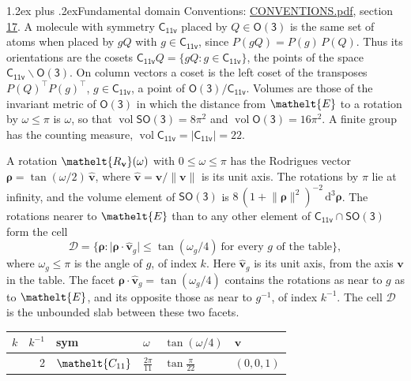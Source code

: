 \documentclass[10pt,a4paper]{article}
\makeatletter
\renewcommand\section{\@startsection{section}{1}{\z@}{-3ex plus -1ex minus -.2ex}%
  {1.2ex plus .2ex}{\normalfont\large\sffamily\bfseries\color{parttitle}}}
\numberwithin{equation}{section}
\newcommand{\eltfont}[1]{{\let\sigma\eltsigma\mathelt{#1}}}
\newcommand{\grp}[1]{\mathsf{#1}}
\newcommand{\cls}[1]{\eltfont{#1}}
\newcommand{\elt}[1]{\eltfont{#1}}
\newcommand{\dirvec}[3]{(#1, #2, #3)}
\newcommand{\unitaxis}{\hat{\mathbf{v}}}
\newcommand{\vv}{\mathbf{v}}
\newcommand{\diff}{\mathrm{d}}
\newcommand{\vol}{\operatorname{vol}}
\newcommand{\rodrigues}{\boldsymbol{\rho}}
\newcommand{\fcell}{\mathcal{D}}
\makeatother
\begin{document}
\section{Fundamental domain}\label{s:fundamental_domain}
Conventions: \href{../../CONVENTIONS.pdf}{CONVENTIONS.pdf}, section \href{../../CONVENTIONS.pdf\#conv.17}{17}.
\leavevmode\label{n:element.placement}A molecule with symmetry $\grp{C_{11v}}$ placed by $Q \in \grp{O(3)}$ is the same set of atoms when placed by $gQ$ with $g \in \grp{C_{11v}}$, since $P(gQ) = P(g)\,P(Q)$. \label{n:operator.cosets}Thus its orientations are the cosets $\grp{C_{11v}}Q = \{gQ : g \in \grp{C_{11v}}\}$, the points of the space $\grp{C_{11v}}\backslash\grp{O(3)}$. On column vectors a coset is the left coset of the transposes $P(Q)^{\top}P(g)^{\top}$, $g \in \grp{C_{11v}}$, a point of $\grp{O(3)}/\grp{C_{11v}}$.
\leavevmode\label{n:operator.volume}Volumes are those of the invariant metric of \href{O3.pdf}{$\grp{O(3)}$} in which the distance from $\elt{E}$ to a rotation by $\omega \le \pi$ is $\omega$, so that $\vol\grp{SO(3)} = 8\pi^2$ and $\vol\grp{O(3)} = 16\pi^2$. A finite group has the counting measure, $\vol\grp{C_{11v}} = |\grp{C_{11v}}| = 22$.

\leavevmode\label{n:vector.rodrigues}\label{n:vector.unitaxis}A rotation $\elt{R_{\vv}}(\omega)$ with $0 \le \omega \le \pi$ has the Rodrigues vector $\rodrigues = \tan(\omega/2)\,\unitaxis$, where $\unitaxis = \vv/\lVert\vv\rVert$ is its unit axis. The rotations by $\pi$ lie at infinity, and the volume element of \href{SO3.pdf}{$\grp{SO(3)}$} is $8\,(1 + \lVert\rodrigues\rVert^2)^{-2}\,\diff^3\rodrigues$.
\leavevmode\label{n:set.cell}The rotations nearer to $\elt{E}$ than to any other element of $\grp{C_{11v}} \cap \grp{SO(3)}$ form the cell
\begin{equation}\label{e:cell}\fcell = \bigl\{\rodrigues : \lvert\rodrigues\cdot\unitaxis_g\rvert \le \tan(\omega_g/4)\ \text{for every $g$ of the table}\bigr\},\end{equation}
where $\omega_g \le \pi$ is the angle of $g$, of index $k$. Here $\unitaxis_g$ is its unit axis, from the axis $\vv$ in the table. The facet $\rodrigues\cdot\unitaxis_g = \tan(\omega_g/4)$ contains the rotations as near to $g$ as to $\elt{E}$, and its opposite those as near to $g^{-1}$, of index $k^{-1}$. The cell $\fcell$ is the unbounded slab between these two facets.
{\small{\renewcommand{\arraystretch}{1.3}\begin{longtable}{@{}rrllll@{}}\toprule
$k$ & $k^{-1}$ & sym & $\omega$ & $\tan(\omega/4)$ & $\vv$\\\midrule\endhead
\bottomrule\endfoot\endlastfoot
1 & 2 & $\cls{C_{11}}$ & $\tfrac{2\pi}{11}$ & $\tan\tfrac{\pi}{22}$ & $\dirvec{0}{0}{1}$\\
\bottomrule\end{longtable}}}
\end{document}
